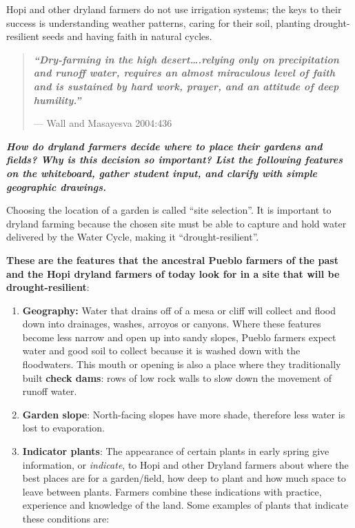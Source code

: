 \documentclass[12pt,]{article}
\providecommand{\tightlist}{%
  \setlength{\itemsep}{0pt}\setlength{\parskip}{0pt}}
\begin{document}
Hopi and other dryland farmers do not use irrigation systems; the keys to their success is understanding weather patterns, caring for their soil, planting drought-resilient seeds and having faith in natural cycles.

\begin{quote}
\textbf{\emph{``Dry-farming in the high desert\ldots.relying only on precipitation and runoff water, requires an almost miraculous level of faith and is sustained by hard work, prayer, and an attitude of deep humility.''}}

--- Wall and Masayesva 2004:436
\end{quote}

\textbf{\emph{How do dryland farmers decide where to place their gardens and fields? Why is this decision so important? List the following features on the whiteboard, gather student input, and clarify with simple geographic drawings. }}

Choosing the location of a garden is called ``site selection''. It is important to dryland farming because the chosen site must be able to capture and hold water delivered by the Water Cycle, making it ``drought-resilient''.

\textbf{These are the features that the ancestral Pueblo farmers of the past and the Hopi dryland farmers of today look for in a site that will be drought-resilient}:

\begin{enumerate}
\def\labelenumi{\arabic{enumi}.}
\tightlist
\item
  \textbf{Geography:} Water that drains off of a mesa or cliff will collect and flood down into drainages, washes, arroyos or canyons. Where these features become less narrow and open up into sandy slopes, Pueblo farmers expect water and good soil to collect because it is washed down with the floodwaters. This mouth or opening is also a place where they traditionally built \textbf{check dams}: rows of low rock walls to slow down the movement of runoff water.
\item
  \textbf{Garden slope}: North-facing slopes have more shade, therefore less water is lost to evaporation.
\item
  \textbf{Indicator plants}: The appearance of certain plants in early spring give information, or \emph{indicate}, to Hopi and other Dryland farmers about where the best places are for a garden/field, how deep to plant and how much space to leave between plants. Farmers combine these indications with practice, experience and knowledge of the land. Some examples of plants that indicate these conditions are:
\end{enumerate}
\end{document}
